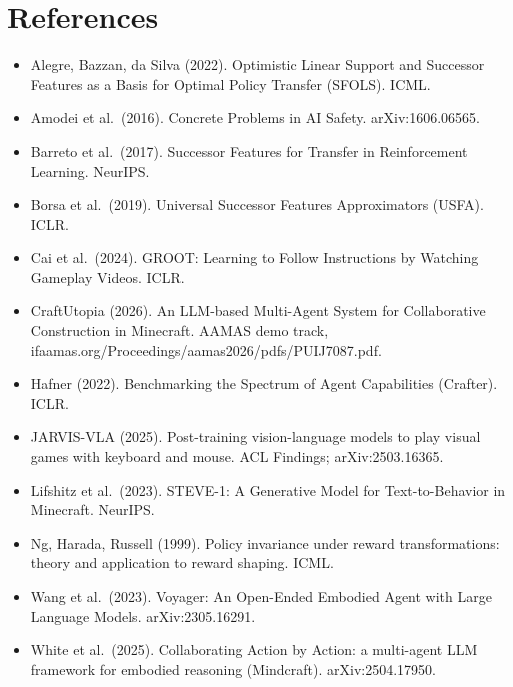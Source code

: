 \section*{References}
\begin{itemize}
\item Alegre, Bazzan, da Silva (2022). Optimistic Linear Support and Successor Features as a Basis for Optimal Policy Transfer (SFOLS). ICML.
\item Amodei et al.\ (2016). Concrete Problems in AI Safety. arXiv:1606.06565.
\item Barreto et al.\ (2017). Successor Features for Transfer in Reinforcement Learning. NeurIPS.
\item Borsa et al.\ (2019). Universal Successor Features Approximators (USFA). ICLR.
\item Cai et al.\ (2024). GROOT: Learning to Follow Instructions by Watching Gameplay Videos. ICLR.
\item CraftUtopia (2026). An LLM-based Multi-Agent System for Collaborative Construction in Minecraft. AAMAS demo track, ifaamas.org/Proceedings/aamas2026/pdfs/PUIJ7087.pdf.
\item Hafner (2022). Benchmarking the Spectrum of Agent Capabilities (Crafter). ICLR.
\item JARVIS-VLA (2025). Post-training vision-language models to play visual games with keyboard and mouse. ACL Findings; arXiv:2503.16365.
\item Lifshitz et al.\ (2023). STEVE-1: A Generative Model for Text-to-Behavior in Minecraft. NeurIPS.
\item Ng, Harada, Russell (1999). Policy invariance under reward transformations: theory and application to reward shaping. ICML.
\item Wang et al.\ (2023). Voyager: An Open-Ended Embodied Agent with Large Language Models. arXiv:2305.16291.
\item White et al.\ (2025). Collaborating Action by Action: a multi-agent LLM framework for embodied reasoning (Mindcraft). arXiv:2504.17950.
\end{itemize}
